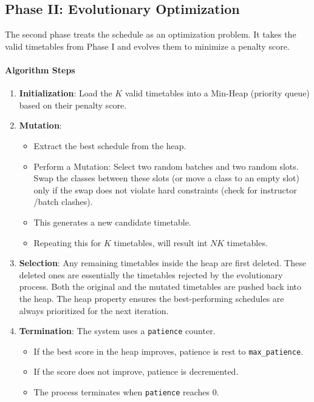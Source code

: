 \documentclass[a4paper,twoside,11pt]{article}
\begin{document}
        \subsection{Phase II: Evolutionary Optimization}
            The second phase treats the schedule as an optimization problem. It takes the valid timetables from Phase I and evolves them to minimize a penalty score.

            \paragraph{Algorithm Steps}
            
            \begin{enumerate}
                \itemsep0em
                \item \textbf{Initialization}: Load the $K$ valid timetables into a Min-Heap (priority queue) based on their penalty score.
                \item \textbf{Mutation}:
                \begin{itemize}
                    \itemsep0em
                    \item Extract the best schedule from the heap.
                    \item Perform a Mutation: Select two random batches and two random slots. Swap the classes between these slots (or move a class to an empty slot) only if the swap does not violate hard constraints (check for instructor /batch clashes).
                    \item This generates a new candidate timetable.
                    \item Repeating this for $K$ timetables, will result int $NK$ timetables.
                \end{itemize}
                \item \textbf{Selection}: Any remaining timetables inside the heap are first deleted. These deleted ones are essentially the timetables rejected by the evolutionary process. Both the original and the mutated timetables are pushed back into the heap. The heap property ensures the best-performing schedules are always prioritized for the next iteration.
                \item \textbf{Termination}: The system uses a \texttt{patience} counter.
                \begin{itemize}
                    \itemsep0em
                    \item If the best score in the heap improves, patience is rest to \texttt{max\_patience}.
                    \item If the score does not improve, patience is decremented.
                    \item The process terminates when \texttt{patience} reaches 0.
                \end{itemize}
            \end{enumerate}
\end{document}
